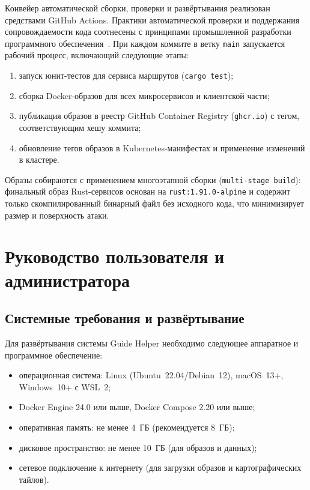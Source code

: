 Конвейер автоматической сборки, проверки и развёртывания реализован средствами GitHub Actions. Практики автоматической проверки и поддержания сопровождаемости кода соотнесены с принципами промышленной разработки программного обеспечения~\cite{mcconnell2017}. При каждом коммите в ветку \texttt{main} запускается рабочий процесс, включающий следующие этапы:
\begin{enumerate}
  \item запуск юнит-тестов для сервиса маршрутов (\texttt{cargo test});
  \item сборка Docker-образов для всех микросервисов и клиентской части;
  \item публикация образов в реестр GitHub Container Registry (\texttt{ghcr.io}) с тегом, соответствующим хешу коммита;
  \item обновление тегов образов в Kubernetes-манифестах и применение изменений в кластере.
\end{enumerate}

Образы собираются с применением многоэтапной сборки (\texttt{multi-stage build}): финальный образ Rust-сервисов основан на \texttt{rust:1.91.0-alpine} и содержит только скомпилированный бинарный файл без исходного кода, что минимизирует размер и поверхность атаки.

\section{Руководство пользователя и администратора}
\label{sec:user-guide}

\subsection{Системные требования и развёртывание}

Для развёртывания системы Guide Helper необходимо следующее аппаратное и программное обеспечение:
\begin{itemize}
  \item операционная система: Linux (Ubuntu~22.04/Debian~12), macOS~13+, Windows~10+ с WSL~2;
  \item Docker Engine 24.0 или выше, Docker Compose 2.20 или выше;
  \item оперативная память: не менее 4~ГБ (рекомендуется 8~ГБ);
  \item дисковое пространство: не менее 10~ГБ (для образов и данных);
  \item сетевое подключение к интернету (для загрузки образов и картографических тайлов).
\end{itemize}

